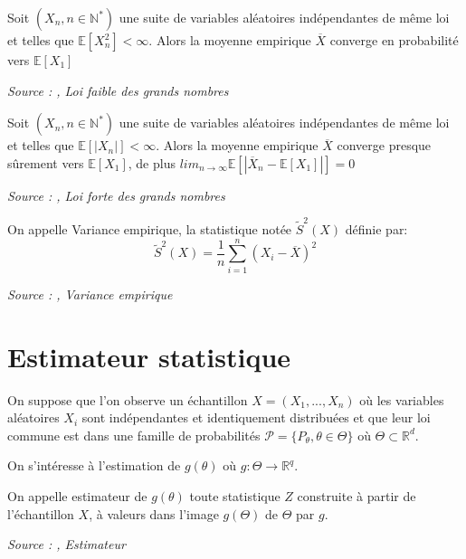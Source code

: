 \begin{definition}\label{def:loi_faible_grands_nombres}
Soit $(X_n, n \in \mathbb{N}^*)$ une suite de variables aléatoires indépendantes de même loi et telles que $\mathbb{E}[X_n^2] < \infty$. Alors la moyenne empirique $\overline{X}$ converge en probabilité vers $\mathbb{E}[X_1]$

\noindent\textit{Source : \cite{ensta_cours}, Loi faible des grands nombres}
\end{definition}

\begin{definition}\label{def:loi_forte_grands_nombres}
Soit $(X_n, n \in \mathbb{N}^*)$ une suite de variables aléatoires indépendantes de même loi et telles que $\mathbb{E}[|X_n|] < \infty$. Alors la moyenne empirique $\overline{X}$ converge presque sûrement vers $\mathbb{E}[X_1]$, de plus $lim_{n \rightarrow \infty} \mathbb{E}[|\overline{X}_n - \mathbb{E}[X_1]|] = 0$

\noindent\textit{Source : \cite{ensta_cours},   Loi forte des grands nombres}
\end{definition}

\begin{definition}\label{def:variance_empirique}
On appelle Variance empirique, la statistique notée $\tilde{S}^2(X)$ définie par:
$$\tilde{S}^2(X) = \frac{1}{n}\sum_{i = 1}^n (X_i - \overline{X})^2$$

\noindent\textit{Source : \cite{statistique_inferentielle},  Variance empirique}
\end{definition}


\section{Estimateur statistique}

On suppose que l'on observe un échantillon $X = (X_1, ..., X_n)$ où les variables aléatoires $X_i$ sont indépendantes et identiquement distribuées et que leur loi commune est dans une famille de probabilités $\mathcal{P} = \{P_\theta, \theta \in \Theta\} \text{ où } \Theta \subset \mathbb{R}^d$.

On s'intéresse à l'estimation de $g(\theta)$ où $g: \Theta \rightarrow \mathbb{R}^q$.

\begin{definition}\label{def:estimateur}
On appelle estimateur de $g(\theta)$ toute statistique $Z$ construite à partir de l'échantillon $X$, à valeurs dans l'image $g(\Theta)$ de $\Theta$ par $g$.

\noindent\textit{Source : \cite{stat_ingenieur},  Estimateur}
\end{definition}


